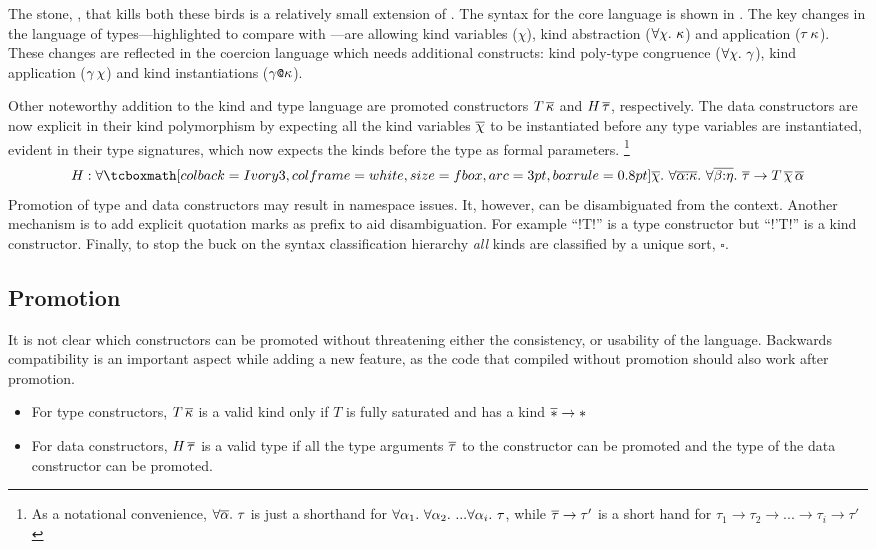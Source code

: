 \documentclass[manuscript,screen,nonacm]{acmart}
\begin{document}
The stone, \SFP, that kills both these birds is a relatively small extension of \SF. The syntax for the core language is shown in . The key changes in the language of types---highlighted to compare with \SFC---are allowing kind variables ($\chi$), kind abstraction ($\forall\chi.~\kappa$) and application ($\tau\, \kappa$). These changes are reflected in the coercion language which needs additional constructs: kind poly-type congruence ($\forall\chi.~\gamma$), kind application ($\gamma\,\chi$) and kind instantiations ($\gamma\texttt{@}\kappa$).

Other noteworthy addition to the kind and type language are promoted constructors $T\,\overline{\kappa}$ and $H\,\overline{\tau}$, respectively. The data constructors are now explicit in their kind polymorphism by expecting all the kind variables $\overline{\chi}$ to be instantiated before any type variables are instantiated, evident in their type signatures, which now expects the kinds before the type as formal parameters.
\footnote{As a notational convenience, $\forall\overline{\alpha}.~\tau$ is just a shorthand for $\forall\alpha_1.~\forall\alpha_2.~... \forall\alpha_i.~\tau$, while $\overline{\tau} \to \tau'$ is a short hand for $\tau_1 \to \tau_2 \to ... \to \tau_i \to \tau'$
}{$$ H : \Forall {\shl{\many\chi}} {\Forall {\many{\TyVar\co\kappa}} {\Forall {\many{\beta\co\eta}} {\many\tau \to T \App\many{\chi}\App\many{\TyVar}}}} $$
}
Promotion of type and data constructors may result in namespace issues. It, however, can be disambiguated from the context. Another mechanism is to add explicit quotation marks as prefix to aid disambiguation.
For example ``!T!'' is a type constructor but ``!'T!'' is a kind constructor.
Finally, to stop the buck on the syntax classification hierarchy \emph{all} kinds are classified by a unique sort, $\square$.


\subsection{Promotion}
It is not clear which constructors can be promoted without threatening either the consistency, or usability of the language. Backwards compatibility is an important aspect while adding a new feature, as the code that compiled without promotion should also work after promotion.

\begin{itemize}
\item For type constructors, $T\,\overline{\kappa}$ is a valid kind only if $T$ is fully saturated and has a kind $\overline{\ast} \to \ast$
\item For data constructors, $H\,\overline{\tau}$ is a valid type if all the type arguments $\overline{\tau}$ to the constructor can be promoted and the type of the data constructor can be promoted.
\end{itemize}
\end{document}
